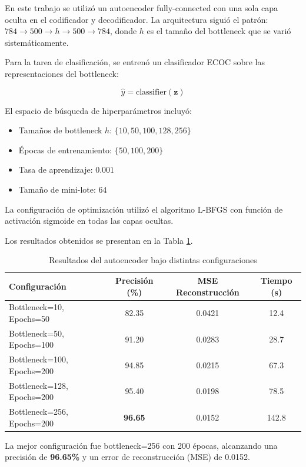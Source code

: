 \documentclass[11pt, a4paper]{article}
\begin{document}
En este trabajo se utilizó un autoencoder fully-connected con una sola capa oculta en el codificador y decodificador. La arquitectura siguió el patrón: $784 \rightarrow 500 \rightarrow h \rightarrow 500 \rightarrow 784$, donde $h$ es el tamaño del bottleneck que se varió sistemáticamente.

Para la tarea de clasificación, se entrenó un clasificador ECOC sobre las representaciones del bottleneck:

\begin{equation}
\hat{y} = \text{classifier}(\mathbf{z})
\end{equation}

El espacio de búsqueda de hiperparámetros incluyó:
\begin{itemize}
    \item Tamaños de bottleneck $h$: $\{10, 50, 100, 128, 256\}$
    \item Épocas de entrenamiento: $\{50, 100, 200\}$
    \item Tasa de aprendizaje: $0.001$
    \item Tamaño de mini-lote: $64$
\end{itemize}

La configuración de optimización utilizó el algoritmo L-BFGS con función de activación sigmoide en todas las capas ocultas.

Los resultados obtenidos se presentan en la Tabla \ref{tab:autoencoder_results}.

\begin{table}[H]
\centering
\caption{Resultados del autoencoder bajo distintas configuraciones}
\label{tab:autoencoder_results}
\begin{tabular}{lccc}
\toprule
Configuración & Precisión (\%) & MSE Reconstrucción & Tiempo (s) \\
\midrule
Bottleneck=10, Epochs=50 & 82.35 & 0.0421 & 12.4 \\
Bottleneck=50, Epochs=100 & 91.20 & 0.0283 & 28.7 \\
Bottleneck=100, Epochs=200 & 94.85 & 0.0215 & 67.3 \\
Bottleneck=128, Epochs=200 & 95.40 & 0.0198 & 78.5 \\
Bottleneck=256, Epochs=200 & \textbf{96.65} & 0.0152 & 142.8 \\
\bottomrule
\end{tabular}
\end{table}

La mejor configuración fue bottleneck=256 con 200 épocas, alcanzando una precisión de \textbf{96.65\%} y un error de reconstrucción (MSE) de 0.0152.
\end{document}

